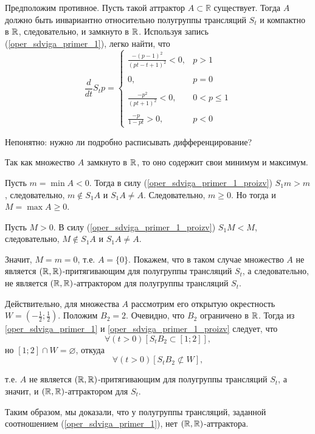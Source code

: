 Предположим противное.
Пусть такой аттрактор $A \subset \mathbb{R}$ существует.
Тогда $A$ должно быть инвариантно относительно полугруппы трансляций $S_t$ и компактно в $\mathbb{R}$, следовательно, и замкнуто в $\mathbb{R}$.
Используя запись (\ref{oper_sdviga_primer_1}), легко найти, что
\begin{equation}\label{oper_sdviga_primer_1_proizv}
	\frac{d}{dt}S_t p =
	\left\{
		\begin{array}{ll}
			\frac{-(p-1)^2}{(pt-t+1)^2} < 0, & p > 1
		\\\\
			0,        & p = 0
		\\\\
			\frac{-p^2}{(pt+1)^2} < 0,        & 0 < p \leq 1
		\\\\
			\frac{-p}{1 - pt} > 0,      & p < 0
		\end{array}
	\right.
\end{equation}

Непонятно: нужно ли подробно расписывать дифференцирование?

Так как множество $A$ замкнуто в $\mathbb{R}$, то оно содержит свои минимум и максимум.

Пусть $m = \min A < 0$.
Тогда в силу (\ref{oper_sdviga_primer_1_proizv}) $S_1 m > m$, следовательно, $m \notin S_1 A$ и $S_1 A \neq A$.
Следовательно, $m \geq 0$.
Но тогда и $M = \max A \geq 0$.

Пусть $M > 0$.
В силу (\ref{oper_sdviga_primer_1_proizv}) $S_1 M < M$, следовательно, $M \notin S_1 A$ и $S_1 A \neq A$.

Значит, $M=m=0$, т.е. $A=\{0\}$.
Покажем, что в таком случае множество $A$ не является $(\mathbb{R},\mathbb{R})$-притягивающим для полугруппы трансляций $S_t$, а следовательно, не является $(\mathbb{R},\mathbb{R})$-аттрактором для полугруппы трансляций $S_t$.

Действительно, для множества $A$ рассмотрим его открытую окрестность $ W = (-\frac12;\frac12)$.
Положим $B_2={2}$.
Очевидно, что $B_2$ ограничено в $\mathbb{R}$.
Тогда из \ref{oper_sdviga_primer_1} и \ref{oper_sdviga_primer_1_proizv} следует, что
$$
	\forall(t>0)[S_t B_2 \subset [1; 2]],
$$
но $[1;2]\cap W = \varnothing$, откуда
$$
	\forall(t>0)[S_t B_2 \not\subset W],
$$

т.е. $A$ не является $(\mathbb{R},\mathbb{R})$-притягивающим для полугруппы трансляций $S_t$,
а значит, и $(\mathbb{R},\mathbb{R})$-аттрактором для $S_t$.

Таким образом, мы доказали, что у полугруппы трансляций, заданной соотношением (\ref{oper_sdviga_primer_1}),
нет $(\mathbb{R},\mathbb{R})$-аттрактора.

